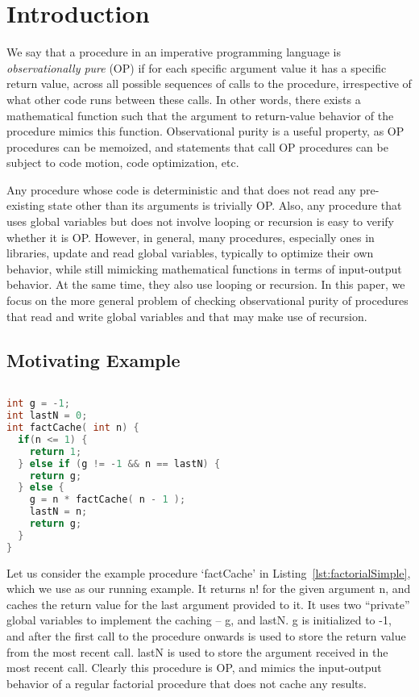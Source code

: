 \section{Introduction}

We say that a procedure in an imperative programming language is
\emph{observationally pure} (OP) if for each specific argument value it has
a specific return value, across all possible sequences of calls to the
procedure, irrespective of what other code runs between these calls.  In
other words, there exists a mathematical function such that the argument to
return-value behavior of the procedure mimics this function. Observational
purity is a useful property, as OP procedures can be memoized, and
statements that call OP procedures can be subject to code motion, code
optimization, etc.

Any procedure whose code is deterministic and that does not read any
pre-existing state other than its arguments is trivially OP. Also, any
procedure that uses global variables but does not involve looping or
recursion is easy to verify whether it is OP. However, in general, many
procedures, especially ones in libraries, update and read global variables,
typically to optimize their own behavior, while still mimicking
mathematical functions in terms of input-output behavior. At the same time,
they also use looping or recursion. In this paper, we focus on the more
general problem of checking observational purity of procedures that read
and write global variables and that may make use of recursion.

\subsection{Motivating Example}

\begin{lstlisting}[language=c, caption= {Procedure `factCache' :
      returns n! and memoizes result for last argument seen.},
    label=lst:factorialSimple]
  
int g = -1;
int lastN = 0;
int factCache( int n) {
  if(n <= 1) {
    return 1;
  } else if (g != -1 && n == lastN) {
    return g;
  } else {
    g = n * factCache( n - 1 );
    lastN = n;
    return g;
  }
}
\end{lstlisting}

Let us consider the example procedure `factCache' in
Listing~\ref{lst:factorialSimple}, which we use as our running example. It
returns n! for the given argument n, and caches the return value for the
last argument provided to it. It uses two ``private'' global variables to
implement the caching -- g, and lastN. g is initialized to -1, and after
the first call to the procedure onwards is used to store the return value
from the most recent call. lastN is used to store the argument received in
the most recent call. Clearly this procedure is OP, and mimics the
input-output behavior of a regular factorial procedure that does not cache
any results. 

